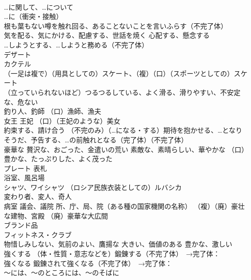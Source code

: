 \documentclass[8pt]{extreport}
\begin{document}
\begin{CJK}{UTF8}{min}
\\	…に関して、…について 
\\	…に（衝突・接触）
\\	根も葉もない噂を触れ回る、あることないことを言いふらす（不完了体）
\\	気を配る、気にかける、配慮する、世話を焼く 心配する、懸念する 
\\	…しようとする、…しようと務める（不完了体）
\\	デザート
\\	カクテル
\\	（一足は複で）（用具としての）スケート、（複）（口）（スポーツとしての）スケート
\\	（立っていられないほど）つるつるしている、よく滑る、滑りやすい、不安定な、危ない
\\	釣り人、釣師 （口）漁師、漁夫
\\	女王 王妃 （口）（王妃のような）美女
\\	約束する、請け合う （不完のみ）（…になる・する）期待を抱かせる、…となりそうだ、予告する、…の前触れとなる（完了体）（不完了体）
\\	豪華な 贅沢な、おごった、金遣いの荒い 素敵な、素晴らしい、華やかな （口）豊かな、たっぷりした、よく茂った
\\	プレート 表札
\\	浴室、風呂場
\\	シャツ、ワイシャツ （ロシア民族衣装としての）ルバシカ
\\	変わり者、変人、奇人
\\	病室 議会、議院 所、庁、局、院（ある種の国家機関の名称） （複）（廃）豪壮な建物、宮殿 （廃）豪華な大広間
\\	ブランド品
\\	フィットネス・クラブ
\\	物惜しみしない、気前のよい、鷹揚な 大きい、価値のある 豊かな、激しい
\\	強くする （体・性質・意志などを）鍛錬する（不完了体）　→完了体：
\\	強くなる 鍛錬されて強くなる（不完了体）　→完了体：
\\	～には、～のところには、～のそばに
\end{CJK}
\end{document}

